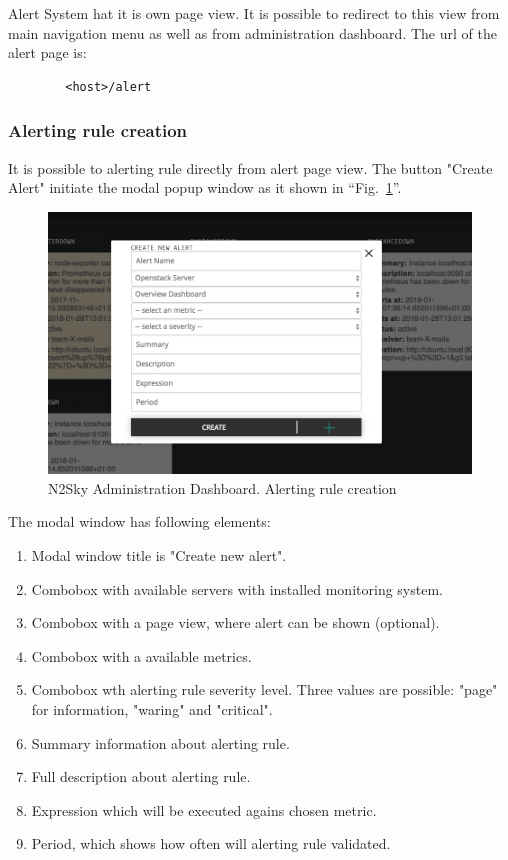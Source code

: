Alert System hat it is own page view. It is possible to redirect to this view from main navigation menu as well as from administration dashboard. The url of the alert page is:
\begin{lstlisting}
		<host>/alert
\end{lstlisting}

\subsubsection{Alerting rule creation}\label{Alerting rule creation}

It is possible to alerting rule directly from alert page view. The button "Create Alert" initiate  the modal popup window as it shown in  ``Fig.~\ref{fig:alert_create}''.

\begin{figure}[htbp]
\begin{center}
  \includegraphics[width=\linewidth]{components/4/pics/alert_create.png}
  \caption{N2Sky Administration Dashboard. Alerting rule creation}
  \label{fig:alert_create}
\end{center}
\end{figure}

The modal window has following elements:
\begin{enumerate}
\item Modal window title is "Create new alert".
\item Combobox with available servers with installed monitoring system.
\item Combobox with a page view, where alert can be shown (optional).
\item Combobox with a available metrics.
\item Combobox wth alerting rule severity level. Three values are possible: "page" for information, "waring" and "critical".
\item Summary information about alerting rule.
\item Full description about alerting rule.
\item Expression which will be executed agains chosen metric.
\item Period, which shows how often will alerting rule validated.
\end{enumerate}

